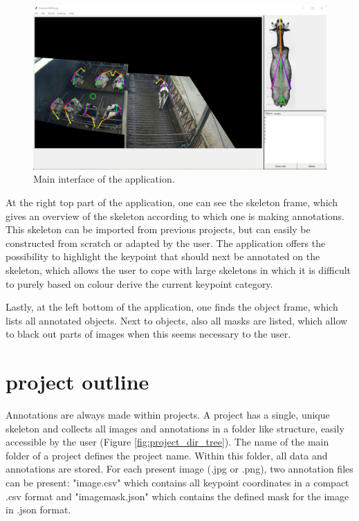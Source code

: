 \documentclass[a4paper, 11pt]{article}
\begin{document}
\begin{figure}[htb]
	\centering
	\includegraphics[width=\textwidth]{application_main_view}
	\captionsetup{width=\textwidth}
	\caption{Main interface of the application.}
	\label{fig:application_main_view}
\end{figure}

At the right top part of the application, one can see the skeleton frame, which gives an overview of the skeleton according to which one is making annotations. This skeleton can be imported from previous projects, but can easily be constructed from scratch or adapted by the user. The application offers the possibility to highlight the keypoint that should next be annotated on the skeleton, which allows the user to cope with large skeletons in which it is difficult to purely based on colour derive the current keypoint category. 

Lastly, at the left bottom of the application, one finds the object frame, which lists all annotated objects. Next to objects, also all masks are listed, which allow to black out parts of images when this seems necessary to the user.

\section{project outline}
Annotations are always made within projects. A project has a single, unique skeleton and collects all images and annotations in a folder like structure, easily accessible by the user (Figure \ref{fig:project_dir_tree}). The name of the main folder of a project defines the project name. Within this folder, all data and annotations are stored. For each present image (.jpg or .png), two annotation files can be present: "image.csv" which contains all keypoint coordinates in a compact .csv format and "image\textunderscore mask.json" which contains the defined mask for the image in .json format.
\end{document}
